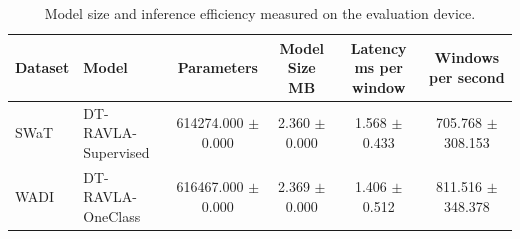 \begin{table}[t]
\centering
\caption{Model size and inference efficiency measured on the evaluation device.}
\label{tab:efficiency}
\renewcommand{\arraystretch}{1.12}
\setlength{\tabcolsep}{4pt}
\begin{tabular}{llcccc}
\hline
Dataset & Model & Parameters & Model Size MB & Latency ms per window & Windows per second \\
\hline
SWaT & DT-RAVLA-Supervised & 614274.000 $\pm$ 0.000 & 2.360 $\pm$ 0.000 & 1.568 $\pm$ 0.433 & 705.768 $\pm$ 308.153 \\
WADI & DT-RAVLA-OneClass & 616467.000 $\pm$ 0.000 & 2.369 $\pm$ 0.000 & 1.406 $\pm$ 0.512 & 811.516 $\pm$ 348.378 \\
\hline
\end{tabular}
\end{table}